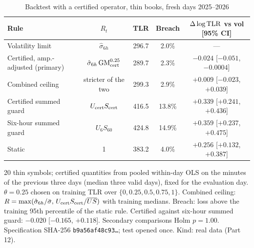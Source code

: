 \documentclass[12pt]{article}
\theoremstyle{definition}
\theoremstyle{remark}
\begin{document}
\begin{table}[t]\centering\small
\begin{threeparttable}
\caption{Backtest with a certified operator, thin books, fresh days 2025--2026}\label{tab:certguard}
\setlength{\tabcolsep}{3pt}
\begin{tabular}{lcccc}
\toprule
Rule & $R_t$ & TLR & Breach & $\Delta\log{\rm TLR}$ vs vol [95\% CI]\\
\midrule
Volatility limit & $\hat\sigma_{6h}$ & 296.7 & 2.0\% & ---\\
Certified, amp.-adjusted (primary) & $\hat\sigma_{6h}\,{\rm GM}_{\rm cert}^{0.25}$ & 289.7 & 2.3\% & $-0.024$ [$-0.051$, $-0.0004$]\\
Combined ceiling & stricter of the two & 299.3 & 2.9\% & $+0.009$ [$-0.023$, $+0.039$]\\
Certified summed guard & $U_{\rm cert}S_{\rm cert}$ & 416.5 & 13.8\% & $+0.339$ [$+0.241$, $+0.436$]\\
Six-hour summed guard & $U_6S_{60}$ & 424.8 & 14.9\% & $+0.359$ [$+0.237$, $+0.475$]\\
Static & 1 & 383.2 & 4.0\% & $+0.256$ [$+0.132$, $+0.387$]\\
\bottomrule
\end{tabular}
\begin{tablenotes}\footnotesize\item 20 thin symbols; certified quantities from pooled within-day OLS on the minutes of the previous three days (median three valid days), fixed for the evaluation day. $\theta=0.25$ chosen on training TLR over $\{0,0.25,0.5,0.75,1\}$. Combined ceiling: $R=\max(\hat\sigma_{6h}/\bar\sigma,\,U_{\rm cert}S_{\rm cert}/\overline{US})$ with training medians. Breach: loss above the training 95th percentile of the static rule. Certified against six-hour summed guard: $-0.020$ [$-0.165$, $+0.118$]. Secondary comparisons Holm $p=1.00$. Specification SHA-256 \texttt{b9a56af48c93\ldots}; test opened once. Kind: real data (Part 12).\end{tablenotes}
\end{threeparttable}
\end{table}
\end{document}
